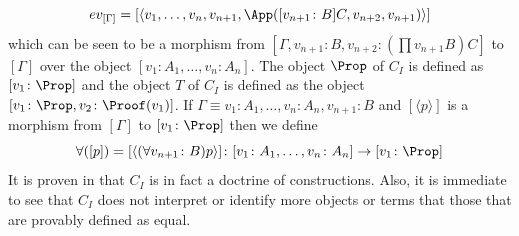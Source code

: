 \[
    ev_{[\Gamma]} = [\langle v_1, \dots, v_n, v_{n+1}, \App([v_{n+1} \colon B]C, v_{n+2}, v_{n+1})\rangle]
\]
which can be seen to be a morphism from $[\Gamma, v_{n+1} \colon B, v_{n+2} \colon (\prod v_{n+1} B) C]$ to $[\Gamma]$
over the object $[v_1 \colon A_1, \dots, v_n \colon A_n]$.
The object $\Prop$ of $C_I$ is defined as $[v_1 \colon \Prop]$ and the object $T$ of $C_I$ is defined as the object
$[v_1 \colon \Prop, v_2 \colon \Proof(v_1)]$.
If $\Gamma \equiv v_1 \colon A_1, \dots, v_n \colon A_n, v_{n+1} \colon B$ and $[\langle p \rangle]$ is a morphism 
from $[\Gamma]$ to $[v_1 \colon \Prop]$ then we define
\[
    \forall([p]) = [\langle (\forall v_{n+1} \colon B) p \rangle] 
        \colon [v_1 \colon A_1, \dots, v_n \colon A_n] 
        \to [v_1 \colon \Prop]
\]
It is proven in \cite{streicher} that $C_I$ is in fact a doctrine of constructions. Also, it is immediate to see
that $C_I$ does not interpret or identify more objects or terms that those that are provably defined as equal.

